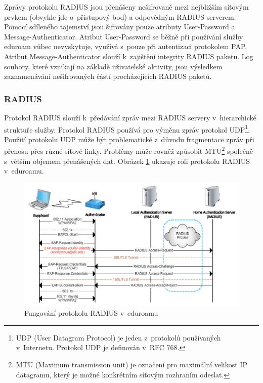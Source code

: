 \documentclass[thesis=M,czech]{FITthesis}[2012/06/26]
\begin{document}
    Zprávy protokolu RADIUS jsou přenášeny nešifrovaně mezi 
    nejbližším síťovým prvkem (obvykle jde o~přístupový bod) a odpovědným RADIUS serverem.
    Pomocí sdíleného tajemství jsou šifrovány pouze atributy User-Password
    a Message-Authenticator. 
    Atribut User-Password se běžně při používání služby eduroam vůbec
    nevyskytuje, využívá s~pouze při autentizaci protokolem PAP.
    Atribut Message-Authenticator slouží k~zajištění integrity RADIUS paketu.
    Log soubory, které vznikají na základě uživatelské aktivity,
    jsou výsledkem zaznamenávání nešifrovaných částí procházejících RADIUS paketů.

  \subsubsection{RADIUS}
   
    Protokol RADIUS slouží k~předávání zpráv mezi RADIUS servery v~hierarchické struktuře služby.
    Protokol RADIUS používá pro výměnu zpráv protokol UDP\footnote{
      UDP (User Datagram Protocol) je jeden z~protokolů používaných v~Internetu.
      Protokol UDP je definován v~RFC 768.
    }.
    Použití protokolu UDP může být problematické z~důvodu fragmentace zpráv
    při přenosu přes různé síťové linky.
    Problémy může rovněž způsobit MTU\footnote{
      MTU (Maximum transmission unit) je označení pro maximální velikost IP datagramu, 
      který je možné konkrétním síťovým rozhraním odeslat.
    }
    společně s~větším objemem přenášených dat. \cite{eduroam_tutorial}
    Obrázek \ref{fig:eduroam_radius} ukazuje roli protokolu RADIUS v~eduroamu.

    \begin{figure}
      \centering
        \includegraphics[scale=0.5]{eduroam_radius.png}
      \caption[Fungování protokolu RADIUS v~eduroamu]{Fungování protokolu RADIUS v~eduroamu \cite{eduroam_tutorial}}
      \label{fig:eduroam_radius}
    \end{figure}
\end{document}
